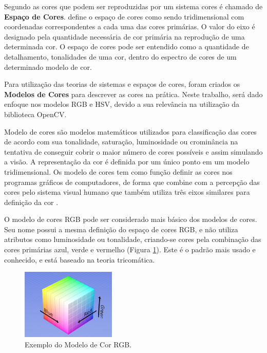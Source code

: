 Segundo  as cores que podem ser reproduzidas por um sistema cores é chamado de \textbf{Espaço de Cores}.  define o espaço de cores como sendo tridimensional com coordenadas correspondentes a cada uma das cores primárias. O valor do eixo é designado pela quantidade necessária de cor primária na reprodução de uma determinada cor. O espaço de cores pode ser entendido como a quantidade de detalhamento, tonalidades de uma cor, dentro do espectro de cores de um determinado modelo de cor.

Para utilização das teorias de sistemas e espaços de cores, foram criados os \textbf{Modelos de Cores} para descrever as cores na prática. Neste trabalho, será dado enfoque  nos modelos RGB e HSV, devido a sua relevância na utilização da biblioteca OpenCV.

Modelo de cores são modelos matemáticos utilizados para classificação das cores de acordo com sua tonalidade, saturação, luminosidade ou crominância na tentativa de conseguir cobrir o maior número de cores possíveis e assim simulando a visão. A representação da cor é definida por um único ponto em um modelo tridimensional. 
Os modelo de cores tem como função definir as cores nos programas gráficos de computadores, de forma que combine com a 
percepção das cores pelo sistema visual humano que também utiliza três eixos similares para definição da cor \cite{Leao:2005}.

O modelo de cores RGB pode ser considerado mais básico dos modelos de cores. Seu nome possui a mesma definição do espaço de cores RGB, e não utiliza  atributos como luminosidade ou tonalidade, criando-se cores pela combinação das cores primárias azul, verde e vermelho (Figura \ref{fig:ModeloRGB}). Este é o padrão mais usado e conhecido, e está baseado na teoria tricomática.

\begin{figure}[H]
	\centering
	\includegraphics[width=0.4\textwidth]{rgb.pdf}
	
\caption{Exemplo do Modelo de Cor RGB.	   }
	\label{fig:ModeloRGB}
\end{figure}

